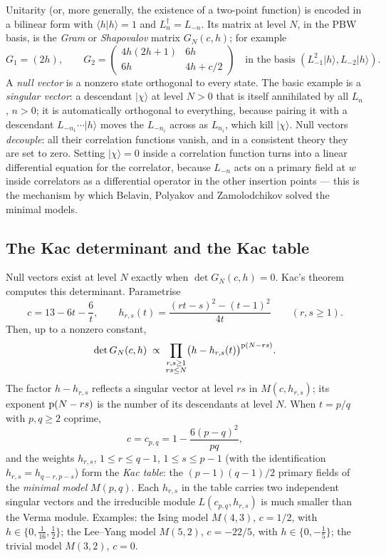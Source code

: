 Unitarity (or, more generally, the existence of a two-point function) is encoded in a bilinear form
with $\langle h|h\rangle = 1$ and $L_n^\dagger = L_{-n}$. Its matrix at level $N$, in the PBW basis, is the
\emph{Gram} or \emph{Shapovalov} matrix $G_N(c,h)$; for example
\begin{equation*}
 G_1 = (2h),\qquad
 G_2 = \begin{pmatrix} 4h(2h+1) & 6h\\ 6h & 4h+c/2\end{pmatrix}
 \quad\text{in the basis }(L_{-1}^2|h\rangle, L_{-2}|h\rangle).
\end{equation*}
A \emph{null vector} is a nonzero state orthogonal to every state. The basic example is a
\emph{singular vector}: a descendant $|\chi\rangle$ at level $N>0$ that is itself annihilated by all
$L_n$, $n>0$; it is automatically orthogonal to everything, because pairing it with a descendant
$L_{-n_1}\cdots|h\rangle$ moves the $L_{-n_i}$ across as $L_{n_i}$, which kill $|\chi\rangle$. Null
vectors \emph{decouple}: all their correlation functions vanish, and in a consistent theory they are
set to zero. Setting $|\chi\rangle = 0$ inside a correlation function turns into a linear differential
equation for the correlator, because $L_{-n}$ acts on a primary field at $w$ inside correlators as a
differential operator in the other insertion points --- this is the mechanism by which Belavin,
Polyakov and Zamolodchikov solved the minimal models.

\subsection{The Kac determinant and the Kac table}

Null vectors exist at level $N$ exactly when $\det G_N(c,h) = 0$. Kac's theorem computes this
determinant. Parametrise
\begin{equation}\label{l06:eq:kacparam}
 c = 13-6t-\frac6t,\qquad
 h_{r,s}(t) = \frac{(rt-s)^2-(t-1)^2}{4t}\qquad(r,s\ge1).
\end{equation}
Then, up to a nonzero constant,
\begin{equation}\label{l06:eq:kac}
 \det G_N(c,h) \;\propto\; \prod_{\substack{r,s\ge1\\ rs\le N}}\bigl(h-h_{r,s}(t)\bigr)^{\mathrm{p}(N-rs)}.
\end{equation}
The factor $h-h_{r,s}$ reflects a singular vector at level $rs$ in $M(c,h_{r,s})$; its exponent
$\mathrm{p}(N-rs)$ is the number of its descendants at level $N$. When $t = p/q$ with $p,q\ge2$ coprime,
\begin{equation*}
 c = c_{p,q} = 1-\frac{6(p-q)^2}{pq},
\end{equation*}
and the weights $h_{r,s}$, $1\le r\le q-1$, $1\le s\le p-1$ (with the identification
$h_{r,s} = h_{q-r,p-s}$) form the \emph{Kac table}: the $(p-1)(q-1)/2$ primary fields of the
\emph{minimal model} $M(p,q)$. Each $h_{r,s}$ in the table carries two independent singular vectors
and the irreducible module $L(c_{p,q},h_{r,s})$ is much smaller than the Verma module. Examples:
the Ising model $M(4,3)$, $c = 1/2$, with $h\in\{0,\frac1{16},\frac12\}$; the Lee--Yang model $M(5,2)$,
$c = -22/5$, with $h\in\{0,-\frac15\}$; the trivial model $M(3,2)$, $c = 0$.

